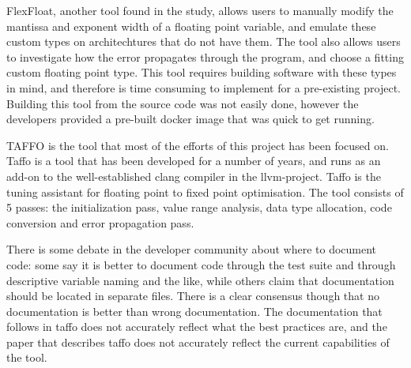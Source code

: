 

FlexFloat, another tool found in the study, allows users to manually modify the mantissa and exponent width of a floating point variable, and emulate these custom types on architechtures that do not have them. The tool also allows users to investigate how the error propagates through the program, and choose a fitting custom floating point type. This tool requires building software with these types in mind, and therefore is time consuming to implement for a pre-existing project. Building this tool from the source code was not easily done, however the developers provided a pre-built docker image that was quick to get running.


TAFFO is the tool that most of the efforts of this project has been focused on. Taffo is a tool that has been developed for a number of years, and runs as an add-on to the well-established clang compiler in the llvm-project.
Taffo is the tuning assistant for floating point to fixed point optimisation. The tool consists of 5 passes: the initialization pass, value range analysis, data type allocation, code conversion and error propagation pass.

There is some debate in the developer community about where to document code: some say it is better to document code through the test suite and through descriptive variable naming and the like, while others claim that documentation should be located in separate files. There is a clear consensus though that no documentation is better than wrong documentation.
The documentation that follows in taffo does not accurately reflect what the best practices are, and the paper that describes taffo does not accurately reflect the current capabilities of the tool.

